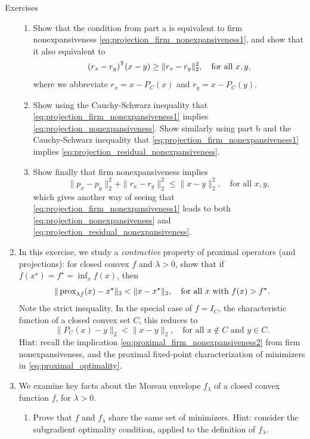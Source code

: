 \begin{xcb}{Exercises}
\begin{enumerate}[label=\thechapter.\arabic*]
\begin{enumerate}[label=\alph*.]
\item Show that the condition from part a is equivalent to firm nonexpansiveness 
  \eqref{eq:projection_firm_nonexpansiveness1}, and show that it also equivalent
  to   
  \[
  (r_x - r_y)^{\mathsf{T}} (x - y) \geq \|r_x - r_y\|_2^2, \quad \text{for all $x,y$},
  \]
  where we abbreviate $r_x = x - P_C(x)$ and $r_y = x - P_C(y)$.

\item Show using the Cauchy-Schwarz inequality that
  \eqref{eq:projection_firm_nonexpansiveness1} implies
  \eqref{eq:projection_nonexpansiveness}. Show similarly using part b and the
  Cauchy-Schwarz inequality that \eqref{eq:projection_firm_nonexpansiveness1}
  implies \eqref{eq:projection_residual_nonexpansiveness}.

\item Show finally that firm nonexpansiveness implies 
  \[
  \|p_x - p_y\|_2^2 + \|r_x - r_y\|_2^2 \leq \|x - y\|_2^2, \quad \text{for all
    $x,y$},
  \]
  which gives another way of seeing that
  \eqref{eq:projection_firm_nonexpansiveness1} leads to both
  \eqref{eq:projection_nonexpansiveness} and
  \eqref{eq:projection_residual_nonexpansiveness}. 
\end{enumerate}

\item In this exercise, we study a \emph{contractive} property of proximal
  operators (and projections): for closed convex $f$ and $\lambda > 0$, show
  that if $f(x^\star) = f^\star = \inf_x f(x)$, then   
  \[
  \| \operatorname{prox}_{\lambda f}(x) - x^\star\|_2 < \|x - x^\star\|_2, \quad \text{for
    all $x$ with $f(x) > f^\star$}.
  \]
  Note the strict inequality. In the special case of $f = I_C$, the
  characteristic function of a closed convex set $C$, this reduces to 
  \[
  \| P_C(x) - y\|_2 < \|x - y\|_2, \quad \text{for all $x \notin C$ and $y \in
    C$}.    
  \]
  Hint: recall the implication \eqref{eq:proximal_firm_nonexpansiveness2} from
  firm nonexpansiveness, and the proximal fixed-point characterization of 
  minimizers in \eqref{eq:proximal_optimality}.  

\item \label{ex:moreau_envelope}
  We examine key facts about the Moreau envelope $f_\lambda$ of a closed convex
  function $f$, for $\lambda > 0$. 

\begin{enumerate}[label=\alph*.]
\item Prove that $f$ and $f_\lambda$ share the same set of minimizers. Hint: 
  consider the subgradient optimality condition, applied to the definition of 
  $f_\lambda$. 


\end{enumerate}
\end{enumerate}
\end{xcb}
